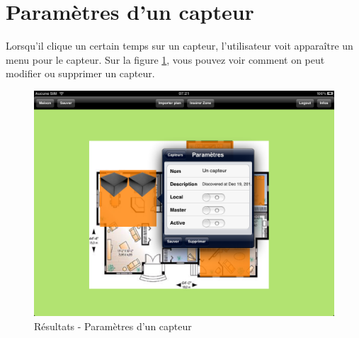 \clearpage


\section{Paramètres d'un capteur} %
\label{sec:param_tres_d_un_capteur}
Lorsqu'il clique un certain temps sur un capteur, l'utilisateur voit apparaître un menu pour le capteur. Sur la figure \ref{gra:res12}, vous pouvez voir comment on peut modifier ou supprimer un capteur.

\begin{figure}[H]
        \centering
        \includegraphics[width=\textwidth]{00_media/07_12.PNG}
        \caption{Résultats - Paramètres d'un capteur}
        \label{gra:res12}
\end{figure}

\clearpage


